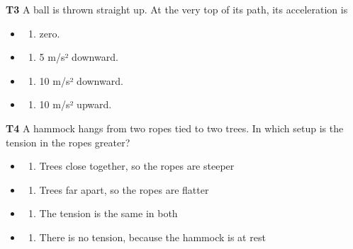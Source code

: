 \documentclass[
]{article}
\providecommand{\tightlist}{%
  \setlength{\itemsep}{0pt}\setlength{\parskip}{0pt}}
\begin{document}
\textbf{T3} A ball is thrown straight up. At the very top of its path,
its acceleration is

\begin{itemize}
\tightlist
\item
  \begin{enumerate}
  \def\labelenumi{\Alph{enumi})}
  \tightlist
  \item
    zero.
  \end{enumerate}
\item
  \begin{enumerate}
  \def\labelenumi{\Alph{enumi})}
  \setcounter{enumi}{1}
  \tightlist
  \item
    5 m/s² downward.
  \end{enumerate}
\item
  \begin{enumerate}
  \def\labelenumi{\Alph{enumi})}
  \setcounter{enumi}{2}
  \tightlist
  \item
    10 m/s² downward.
  \end{enumerate}
\item
  \begin{enumerate}
  \def\labelenumi{\Alph{enumi})}
  \setcounter{enumi}{3}
  \tightlist
  \item
    10 m/s² upward.
  \end{enumerate}
\end{itemize}

\textbf{T4} A hammock hangs from two ropes tied to two trees. In which
setup is the tension in the ropes greater?

\begin{itemize}
\tightlist
\item
  \begin{enumerate}
  \def\labelenumi{\Alph{enumi})}
  \tightlist
  \item
    Trees close together, so the ropes are steeper
  \end{enumerate}
\item
  \begin{enumerate}
  \def\labelenumi{\Alph{enumi})}
  \setcounter{enumi}{1}
  \tightlist
  \item
    Trees far apart, so the ropes are flatter
  \end{enumerate}
\item
  \begin{enumerate}
  \def\labelenumi{\Alph{enumi})}
  \setcounter{enumi}{2}
  \tightlist
  \item
    The tension is the same in both
  \end{enumerate}
\item
  \begin{enumerate}
  \def\labelenumi{\Alph{enumi})}
  \setcounter{enumi}{3}
  \tightlist
  \item
    There is no tension, because the hammock is at rest
  \end{enumerate}
\end{itemize}
\end{document}
